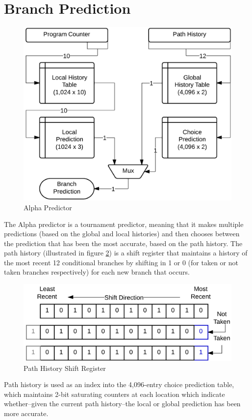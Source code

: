 \documentclass[twocolumn]{article}
\newcommand{\centerimage}[3]{
\begin{figure}[ht!]  
\begin{center} #1
\caption{#2}
\label{#3}
\end{center}
\end{figure}}
\begin{document}
\section{Branch Prediction}\centerimage{\includegraphics[width=\columnwidth]{img/alpha.png}}{Alpha Predictor}{alpha}
The Alpha predictor is a tournament predictor, meaning that it makes multiple predictions (based on the global and local histories) and then chooses between the prediction that has  been the most accurate, based on the path history.  The path history (illustrated in figure \ref{phistory}) is a shift register that maintains a history of the most recent 12 conditional branches by shifting in 1 or 0 (for taken or not taken branches respectively) for each new branch that occurs.\centerimage{\includegraphics[width=\columnwidth]{img/phistory.png}}{Path History Shift Register}{phistory}
Path history is used as an index into the 4,096-entry choice prediction table, which maintains 2-bit saturating counters at each location which indicate whether--given the current path history--the local or global prediction has been more accurate.\\\\  
\end{document}
